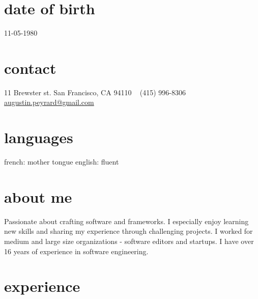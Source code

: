 \documentclass[]{k-cv} %
\begin{document}


\begin{aside} %
\section{date of birth}
\color{gray}11-05-1980
\section{contact}
11 Brewster st.
San Francisco, CA 94110
~
(415) 996-8306
~
\href{mailto:augustin.peyrard@gmail.com}{augustin.peyrard@gmail.com}
\section{languages}
french: mother tongue
english: fluent
\end{aside}


\section{about me}
\begin{freetext}
{Passionate about crafting software and frameworks.
I especially enjoy learning new skills and sharing my experience through challenging projects.
I worked for medium and large size organizations - software editors and startups.
I have over 16 years of experience in software engineering.}
\end{freetext}

\section{experience}
\end{document}
